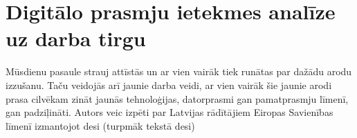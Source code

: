 \chapter{Digitālo prasmju ietekmes analīze uz darba tirgu}
Mūsdienu pasaule strauj attīstās un ar vien vairāk tiek runātas par dažādu arodu izzušanu.
Taču veidojās arī jaunie darba veidi, ar vien vairāk šie jaunie arodi prasa cilvēkam zināt
jaunās tehnoloģijas, datorprasmi gan pamatprasmju līmenī, gan padziļināti.
Autors veic izpēti par Latvijas rādītājiem Eiropas Savienības līmenī izmantojot \acrlong{desi} 
(turpmāk tekstā \acrshort{desi})

    
    
    
    
    
    

    
    

    
    
